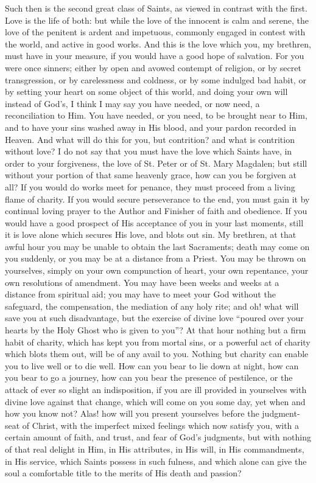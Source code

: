 Such then is the second great class of Saints, as viewed in
contrast with the first. Love is the life of both: but while the love
of the innocent is calm and serene, the love of the penitent is ardent
and impetuous, commonly engaged in contest with the world, and active
in good works. And this is the love which you, my brethren, must have
in your measure, if you would have a good hope of salvation. For you
were once sinners; either by open and avowed contempt of religion, or
by secret transgression, or by carelessness and coldness, or by some
indulged bad habit, or by setting your heart on some object of this
world, and doing your own will instead of God's, I think I may say you
have needed, or now need, a reconciliation to Him. You have needed, or
you need, to be brought near to Him, and to have your sins washed away
in His blood, and your pardon recorded in Heaven. And what will do
this for you, but contrition? and what is contrition without love? I
do not say that you must have the love which Saints have, in order to
your forgiveness, the love of St. Peter or of St. Mary Magdalen; but
still without your portion of that same heavenly grace, how can you be
forgiven at all? If you would do works meet for penance, they must
proceed from a living flame of charity. If you would secure
perseverance to the end, you must gain it by continual loving prayer
to the Author and Finisher of faith and obedience. If you would have a
good prospect of His acceptance of you in your last moments, still it
is love alone which secures His love, and blots out sin. My brethren,
at that awful hour you may be unable to obtain the last Sacraments;
death may come on you suddenly, or you may be at a distance from a
Priest. You may be thrown on yourselves, simply on your own
compunction of heart, your own repentance, your own resolutions of
amendment. You may have been weeks and weeks at a distance from
spiritual aid; you may have to meet your God without the safeguard,
the compensation, the mediation of any holy rite; and oh! what will
save you at such disadvantage, but the exercise of divine love
``poured over your hearts by the Holy Ghost who is given to
you''? At that hour nothing but a firm habit of charity, which has
kept you from mortal sins, or a powerful act of charity which blots
them out, will be of any avail to you. Nothing but charity can enable
you to live well or to die well. How can you bear to lie down at
night, how can you bear to go a journey, how can you bear the presence
of pestilence, or the attack of ever so slight an indisposition, if
you are ill provided in yourselves with divine love against that
change, which will come on you some day, yet when and how you know
not? Alas! how will you present yourselves before the judgment-seat of
Christ, with the imperfect mixed feelings which now satisfy you, with
a certain amount of faith, and trust, and fear of God's judgments, but
with nothing of that real delight in Him, in His attributes, in His
will, in His commandments, in His service, which Saints possess in
such fulness, and which alone can give the soul a comfortable title to
the merits of His death and passion?

